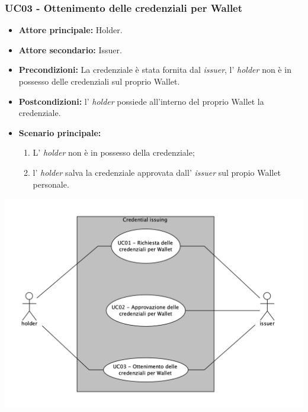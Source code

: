 \subsubsection{UC03 - Ottenimento delle credenziali per Wallet}
\begin{itemize}
\item \textbf{Attore principale:} Holder.
\item \textbf{Attore secondario:} Issuer.
\item \textbf{Precondizioni:} La credenziale è stata fornita dal \textit{issuer}, l' \textit{holder} non è in possesso delle credenziali sul proprio Wallet.
\item \textbf{Postcondizioni:} l' \textit{holder} possiede all’interno del proprio Wallet la credenziale.
\item \textbf{Scenario principale:} 
    \begin{enumerate}
        \item L' \textit{holder} non è in possesso della credenziale;
        \item l' \textit{holder} salva la credenziale approvata dall' \textit{issuer} sul propio Wallet personale.
    \end{enumerate}
\end{itemize}
\begin{center}
    \includegraphics[scale = 0.65]{./res/img/credentialIssuing.png}
\end{center}

